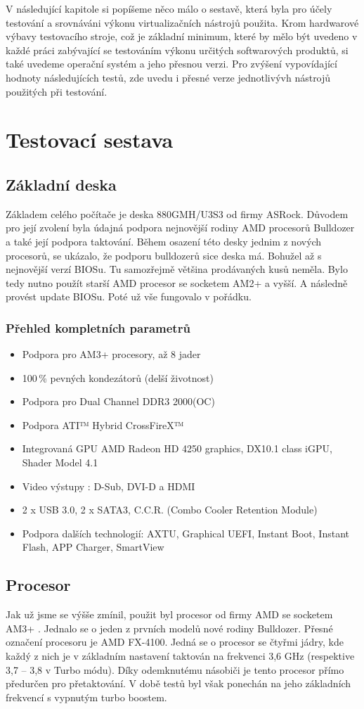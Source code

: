 V následující kapitole si popíšeme něco málo o sestavě, která byla pro účely testování a srovnáváni výkonu virtualizačních nástrojů použita. Krom hardwarové výbavy testovacího stroje, což je základní minimum, které by mělo být uvedeno v každé práci zabývající se testováním výkonu určitých softwarových produktů, si také uvedeme operační systém a jeho přesnou verzi. Pro zvýšení vypovídající hodnoty následujících testů, zde uvedu i přesné verze jednotlivývh nástrojů použitých při testování.

\section{Testovací sestava}
\subsection{Základní deska}
Základem celého počítače je deska 880GMH/U3S3 od firmy ASRock. Důvodem pro její zvolení byla údajná podpora nejnovější rodiny AMD procesorů Bulldozer a také její podpora taktování. Během osazení této desky jednim z nových procesorů, se ukázalo, že podporu bulldozerů sice deska má. Bohužel až s nejnovější verzí BIOSu. Tu samozřejmě většina prodávaných kusů neměla. Bylo tedy nutno použít starší AMD procesor se socketem AM2+ a vyšší. A následně provést update BIOSu. Poté už vše fungovalo v pořádku.
\subsubsection{Přehled kompletních parametrů}
\begin{itemize}
  \item Podpora pro AM3+ procesory, až 8 jader
  \item 100\,\% pevných kondezátorů (delší životnost) 
  \item Podpora pro Dual Channel DDR3 2000(OC)
  \item Podpora ATI™ Hybrid CrossFireX™
  \item Integrovaná GPU AMD Radeon HD 4250 graphics, DX10.1 class iGPU, Shader Model 4.1
  \item Video výstupy : D-Sub, DVI-D a HDMI
  \item 2 x USB 3.0, 2 x SATA3, C.C.R. (Combo Cooler Retention Module)
  \item Podpora dalších technologií: AXTU, Graphical UEFI, Instant Boot, Instant Flash, APP Charger, SmartView
\end{itemize}

\subsection{Procesor}
Jak už jsme se výšše zmínil, použit byl procesor od firmy AMD se socketem AM3+ . Jednalo se o jeden z prvních modelů nové rodiny Bulldozer. Přesné označení procesoru je AMD FX-4100. Jedná se o procesor se čtyřmi jádry, kde každý z nich je v základním nastavení taktován na frekvenci 3,6 GHz (respektive 3,7 -- 3,8 v Turbo módu). Díky odemknutému násobiči je tento procesor přímo předurčen pro přetaktování. V době testů byl však ponechán na jeho základních frekvencí s vypnutým turbo boostem.

